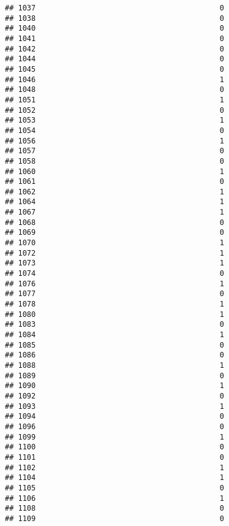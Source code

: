 \documentclass[
]{article}
\begin{document}
\begin{verbatim}
## 1037                                          0
## 1038                                          0
## 1040                                          0
## 1041                                          0
## 1042                                          0
## 1044                                          0
## 1045                                          0
## 1046                                          1
## 1048                                          0
## 1051                                          1
## 1052                                          0
## 1053                                          1
## 1054                                          0
## 1056                                          1
## 1057                                          0
## 1058                                          0
## 1060                                          1
## 1061                                          0
## 1062                                          1
## 1064                                          1
## 1067                                          1
## 1068                                          0
## 1069                                          0
## 1070                                          1
## 1072                                          1
## 1073                                          1
## 1074                                          0
## 1076                                          1
## 1077                                          0
## 1078                                          1
## 1080                                          1
## 1083                                          0
## 1084                                          1
## 1085                                          0
## 1086                                          0
## 1088                                          1
## 1089                                          0
## 1090                                          1
## 1092                                          0
## 1093                                          1
## 1094                                          0
## 1096                                          0
## 1099                                          1
## 1100                                          0
## 1101                                          0
## 1102                                          1
## 1104                                          1
## 1105                                          0
## 1106                                          1
## 1108                                          0
## 1109                                          0

\end{verbatim}
\end{document}
